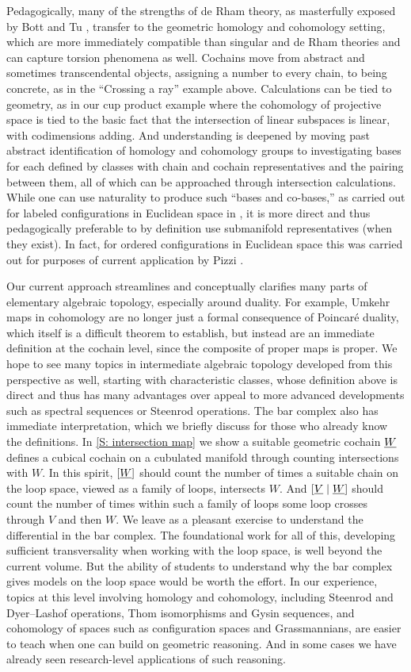 Pedagogically, many of the strengths of de Rham theory, as masterfully exposed by Bott and Tu \cite{BottTu82}, transfer to the geometric homology and cohomology setting, which are more immediately compatible than singular and de Rham theories and can capture torsion phenomena as well.
Cochains move from abstract and sometimes transcendental objects, assigning a number to every chain, to being concrete, as in the ``Crossing a ray'' example above.
Calculations can be tied to geometry, as in our cup product example where the cohomology of projective space is tied to the basic fact that the intersection of linear subspaces is linear, with codimensions adding.
And understanding is deepened by moving past abstract identification of homology and cohomology groups to investigating bases for each defined by classes with chain and cochain representatives and the pairing between them, all of which can be approached through intersection calculations.
While one can use naturality to produce such ``bases and co-bases,'' as carried out for labeled configurations in Euclidean space in \cite{Sinh13}, it is more direct and thus pedagogically preferable to by definition use submanifold representatives (when they exist).
In fact, for ordered configurations in Euclidean space this was carried out for purposes of current application by Pizzi \cite{Pizzi26}.

Our current approach streamlines and conceptually clarifies many parts of elementary algebraic topology, especially around duality.
For example, Umkehr maps in cohomology are no longer just a formal consequence of Poincar\'e duality, which itself is a difficult theorem to establish, but instead are an immediate definition at the cochain level, since the composite of proper maps is proper.
We hope to see many topics in intermediate algebraic topology developed from this perspective as well, starting with characteristic classes, whose definition above is direct and thus has many advantages over appeal to more advanced developments such as spectral sequences or Steenrod operations.
The bar complex also has immediate interpretation, which we briefly discuss for those who already know the definitions.
In \cref{S: intersection map} we show a suitable geometric cochain $\underline{W}$ defines a cubical cochain on a cubulated manifold through counting intersections with $W$.
In this spirit, $[\underline{W}]$ should count the number of times a suitable chain on the loop space, viewed as a family of loops, intersects $W$.
And $[\underline{V} \mid \underline{W}]$ should count the number of times within such a family of loops some loop crosses through $V$ and then $W$.
We leave as a pleasant exercise to understand the differential in the bar complex.
The foundational work for all of this, developing sufficient transversality when working with the loop space, is well beyond the current volume.
But the ability of students to understand why the bar complex gives models on the loop space would be worth the effort.
In our experience, topics at this level involving homology and cohomology, including Steenrod and Dyer--Lashof operations, Thom isomorphisms and Gysin sequences, and cohomology of spaces such as configuration spaces and Grassmannians, are easier to teach when one can build on geometric reasoning.
And in some cases we have already seen research-level applications of such reasoning.
